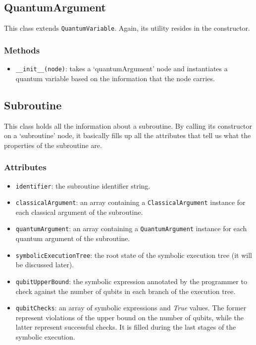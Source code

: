 \documentclass[12pt,a4paper]{report}
\theoremstyle{definition}
\theoremstyle{definition}
\theoremstyle{definition}
\begin{document}
\subsection{QuantumArgument}
This class extends \texttt{QuantumVariable}.
Again, its utility resides in the constructor.
\subsubsection{Methods}
\begin{itemize}
    \itemsep 0em
    \item \texttt{\_\_init\_\_(node)}: takes a `quantumArgument' node and instantiates a quantum variable based on the information that the node carries.
\end{itemize}

\subsection{Subroutine}
This class holds all the information about a subroutine. By calling its constructor on a `subroutine' node, it basically fills up all the attributes that tell us what the properties of the subroutine are.
\subsubsection{Attributes}
\begin{itemize}
    \itemsep 0em
    \item \texttt{identifier}: the subroutine identifier string.
    \item \texttt{classicalArgument}: an array containing a \texttt{ClassicalArgument} instance for each classical argument of the subroutine.
    \item \texttt{quantumArgument}: an array containing a \texttt{QuantumArgument} instance for each quantum argument of the subroutine.
    \item \texttt{symbolicExecutionTree}: the root state of the symbolic execution tree (it will be discussed later).
    \item \texttt{qubitUpperBound}: the symbolic expression annotated by the programmer to check against the number of qubits in each branch of the execution tree.
    \item \texttt{qubitChecks}: an array of symbolic expressions and \textit{True} values. The former represent violations of the upper bound on the number of qubits, while the latter represent successful checks. It is filled during the last stages of the symbolic execution.
\end{itemize}
\end{document}
